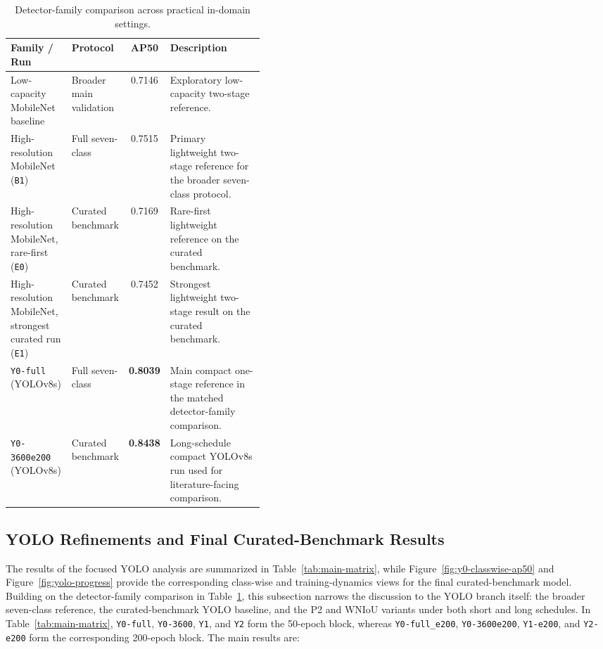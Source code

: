 \documentclass[10pt,a4paper]{article}
\newcommand{\best}[1]{\textbf{#1}}
\begin{document}
\begin{table}[b]
  \centering
  \caption{Detector-family comparison across practical in-domain settings.}
  \label{tab:family-results}
  \footnotesize
  \setlength{\tabcolsep}{4pt}
  \begin{tabularx}{\linewidth}{>{\raggedright\arraybackslash}p{0.24\linewidth} >{\raggedright\arraybackslash}p{0.18\linewidth} c X}
    \toprule
    Family / Run & Protocol & AP50 & Description \\
    \midrule
    Low-capacity MobileNet baseline & Broader main validation & 0.7146 & Exploratory low-capacity two-stage reference. \\
    High-resolution MobileNet (\texttt{B1}) & Full seven-class & 0.7515 & Primary lightweight two-stage reference for the broader seven-class protocol. \\
    High-resolution MobileNet, rare-first (\texttt{E0}) & Curated benchmark & 0.7169 & Rare-first lightweight reference on the curated benchmark. \\
    High-resolution MobileNet, strongest curated run (\texttt{E1}) & Curated benchmark & 0.7452 & Strongest lightweight two-stage result on the curated benchmark. \\
    \texttt{Y0-full} (YOLOv8s) & Full seven-class & \best{0.8039} & Main compact one-stage reference in the matched detector-family comparison. \\
    \texttt{Y0-3600e200} (YOLOv8s) & Curated benchmark & \best{0.8438} & Long-schedule compact YOLOv8s run used for literature-facing comparison. \\
    \bottomrule
  \end{tabularx}
\end{table}


\subsection{YOLO Refinements and Final Curated-Benchmark Results}
\label{sec:main-results}

The results of the focused YOLO analysis are summarized in Table~\ref{tab:main-matrix}, while Figure~\ref{fig:y0-classwise-ap50} and Figure~\ref{fig:yolo-progress} provide the corresponding class-wise and training-dynamics views for the final curated-benchmark model. Building on the detector-family comparison in Table~\ref{tab:family-results}, this subsection narrows the discussion to the YOLO branch itself: the broader seven-class reference, the curated-benchmark YOLO baseline, and the P2 and WNIoU variants under both short and long schedules. In Table~\ref{tab:main-matrix}, \texttt{Y0-full}, \texttt{Y0-3600}, \texttt{Y1}, and \texttt{Y2} form the 50-epoch block, whereas \texttt{Y0-full\_e200}, \texttt{Y0-3600e200}, \texttt{Y1-e200}, and \texttt{Y2-e200} form the corresponding 200-epoch block.
The main results are:
\end{document}
